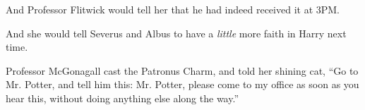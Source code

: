 And Professor Flitwick would tell her that he had indeed received it at 3PM.

And she would tell Severus and Albus to have a \emph{little} more faith in Harry next time.

Professor McGonagall cast the Patronus Charm, and told her shining cat, ``Go to Mr. Potter, and tell him this: Mr. Potter, please come to my office as soon as you hear this, without doing anything else along the way.''
